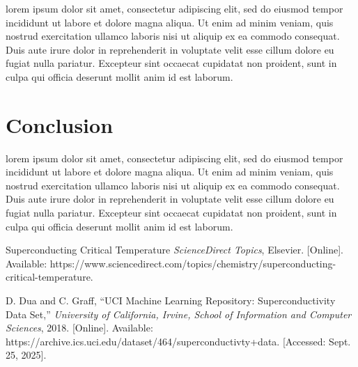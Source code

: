 \documentclass[conference]{IEEEtran}
\begin{document}
lorem ipsum dolor sit amet, consectetur adipiscing elit, sed do eiusmod tempor incididunt ut labore et dolore magna aliqua. Ut enim ad minim veniam, quis nostrud exercitation ullamco laboris nisi ut aliquip ex ea commodo consequat. Duis aute irure dolor in reprehenderit in voluptate velit esse cillum dolore eu fugiat nulla pariatur. Excepteur sint occaecat cupidatat non proident, sunt in culpa qui officia deserunt mollit anim id est laborum.
\section{Conclusion}
lorem ipsum dolor sit amet, consectetur adipiscing elit, sed do eiusmod tempor incididunt ut labore et dolore magna aliqua. Ut enim ad minim veniam, quis nostrud exercitation ullamco laboris nisi ut aliquip ex ea commodo consequat. Duis aute irure dolor in reprehenderit in voluptate velit esse cillum dolore eu fugiat nulla pariatur. Excepteur sint occaecat cupidatat non proident, sunt in culpa qui officia deserunt mollit anim id est laborum.
\begin{thebibliography}{00}

Superconducting Critical Temperature \emph{ScienceDirect Topics}, Elsevier. [Online]. 
Available: https://www.sciencedirect.com/topics/chemistry/superconducting-critical-temperature. 

D. Dua and C. Graff, ``UCI Machine Learning Repository: Superconductivity Data Set,'' 
\emph{University of California, Irvine, School of Information and Computer Sciences}, 2018. 
[Online]. Available: https://archive.ics.uci.edu/dataset/464/superconductivty+data. 
[Accessed: Sept. 25, 2025].

\end{thebibliography}
\end{document}
